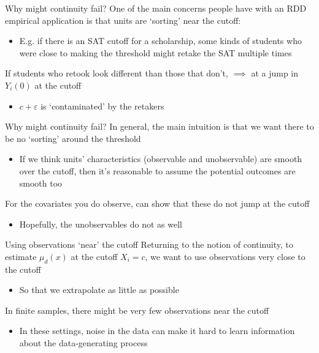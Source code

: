 \documentclass[aspectratio=169,t,11pt,table]{beamer}
\begin{document}


\begin{frame}{Why might continuity fail?}{}
  One of the main concerns people have with an RDD empirical application is that units are `sorting' near the cutoff:
  \begin{itemize}
    \item E.g. if there is an SAT cutoff for a scholarship, some kinds of students who were close to making the threshold might retake the SAT multiple times
  \end{itemize}

  \bigskip
  If students who retook look different than those that don't, $\implies$ at a jump in $Y_{i}(0)$ at the cutoff
  \begin{itemize}
    \item $c + \varepsilon$ is `contaminated' by the retakers 
  \end{itemize}
\end{frame}

\begin{frame}{Why might continuity fail?}{}
  In general, the main intuition is that we want there to be no `sorting' around the threshold
  \begin{itemize}
    \item If we think units' characteristics (observable and unobservable) are smooth over the cutoff, then it's reasonable to assume the potential outcomes are smooth too
  \end{itemize}

  \pause
  \bigskip
  For the covariates you do observe, can show that these do not jump at the cutoff
  \begin{itemize}
    \item Hopefully, the unobservables do not as well
  \end{itemize}
\end{frame}

\begin{frame}{Using observations `near' the cutoff}{}
  Returning to the notion of continuity, to estimate $\mu_d(x)$ at the cutoff $X_i = c$, we want to use observations very close to the cutoff
  \begin{itemize}
    \item So that we extrapolate as little as possible
  \end{itemize}

  \bigskip
  In finite samples, there might be very few observations near the cutoff
  \begin{itemize}
    \item In these settings, noise in the data can make it hard to learn information about the data-generating process
  \end{itemize}
\end{frame}
\end{document}
